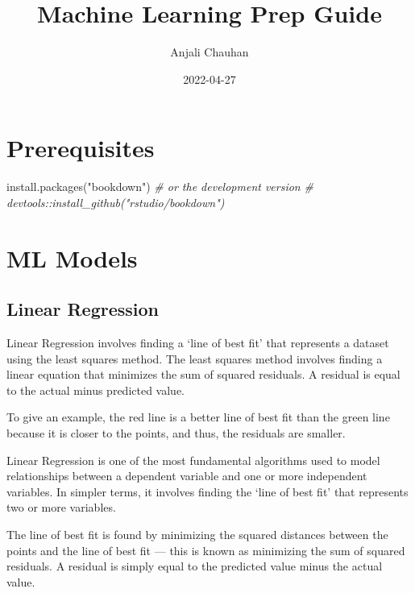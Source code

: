 \documentclass[
]{book}
\title{Machine Learning Prep Guide}
\author{Anjali Chauhan}
\date{2022-04-27}
\newenvironment{Shaded}{\begin{snugshade}}{\end{snugshade}}
\newcommand{\CommentTok}[1]{\textcolor[rgb]{0.56,0.35,0.01}{\textit{#1}}}
\newcommand{\FunctionTok}[1]{\textcolor[rgb]{0.00,0.00,0.00}{#1}}
\newcommand{\NormalTok}[1]{#1}
\newcommand{\StringTok}[1]{\textcolor[rgb]{0.31,0.60,0.02}{#1}}
\begin{document}
\maketitle

{
\setcounter{tocdepth}{1}
\tableofcontents
}
\hypertarget{prerequisites}{%
\chapter{Prerequisites}\label{prerequisites}}

\begin{Shaded}
\begin{Highlighting}[]
\FunctionTok{install.packages}\NormalTok{(}\StringTok{"bookdown"}\NormalTok{)}
\CommentTok{\# or the development version}
\CommentTok{\# devtools::install\_github("rstudio/bookdown")}
\end{Highlighting}
\end{Shaded}

\hypertarget{intro}{%
\chapter{ML Models}\label{intro}}

\hypertarget{linear-regression}{%
\section{Linear Regression}\label{linear-regression}}

Linear Regression involves finding a `line of best fit' that represents a dataset using the least squares method. The least squares method involves finding a linear equation that minimizes the sum of squared residuals. A residual is equal to the actual minus predicted value.

To give an example, the red line is a better line of best fit than the green line because it is closer to the points, and thus, the residuals are smaller.

Linear Regression is one of the most fundamental algorithms used to model relationships between a dependent variable and one or more independent variables. In simpler terms, it involves finding the `line of best fit' that represents two or more variables.

The line of best fit is found by minimizing the squared distances between the points and the line of best fit --- this is known as minimizing the sum of squared residuals. A residual is simply equal to the predicted value minus the actual value.
\end{document}

